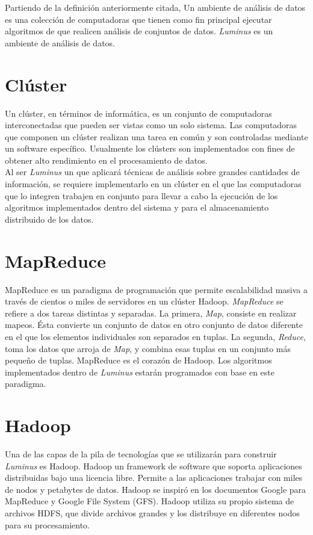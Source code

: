 Partiendo de la definición anteriormente citada, Un ambiente de análisis de datos es una colección de computadoras que tienen como fin principal ejecutar algoritmos de que realicen análisis de conjuntos de datos. \emph{Luminus} es un ambiente de análisis de datos.\\

\section{Clúster}
Un clúster, en términos de informática, es un conjunto de computadoras interconectadas que pueden ser vistas como un solo sistema. Las computadoras que componen un clúster realizan una tarea en común y son controladas mediante un software específico. Usualmente los clústers son implementados con fines de obtener alto rendimiento en el procesamiento de datos.\cite{cluster}\\

Al ser \emph{Luminus} un  que aplicará técnicas de análisis sobre grandes cantidades de información, se requiere implementarlo en un clúster en el que las computadoras que lo integren trabajen en conjunto para llevar a cabo la ejecución de los algoritmos implementados dentro del sistema y para el almacenamiento distribuido de los datos.\\

\section{MapReduce}
MapReduce es un paradigma de programación que permite escalabilidad masiva a través de cientos o miles de servidores en un clúster Hadoop. \emph{MapReduce} se refiere a dos tareas distintas y separadas. La primera, \emph{Map}, consiste en realizar mapeos. Ésta convierte un conjunto de datos en otro conjunto de datos diferente en el que los elementos individuales son separados en tuplas. La segunda, \emph{Reduce}, toma los datos que arroja de \emph{Map}, y combina esas tuplas en un conjunto más pequeño de tuplas. MapReduce es el corazón de Hadoop.\cite{mapReduce} Los algoritmos implementados dentro de \emph{Luminus} estarán programados con base en este paradigma.

\section{Hadoop} \label{sect:hadoop}
Una de las capas de la pila de tecnologías que se utilizarán para construir \emph{Luminus} es Hadoop. Hadoop un framework de software que soporta aplicaciones distribuidas bajo una licencia libre. Permite a las aplicaciones trabajar con miles de nodos y petabytes de datos. Hadoop se inspiró en los documentos Google para MapReduce y Google File System (GFS). Hadoop utiliza su propio sistema de archivos HDFS, que divide archivos grandes y los distribuye en diferentes nodos para su procesamiento.\cite{hadoop}\\

